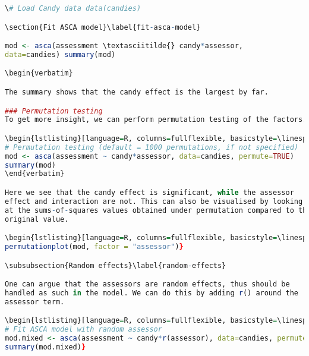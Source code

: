 \begin{lstlisting}[language=R, columns=fullflexible, basicstyle=\linespread{0.85}\small\ttfamily, stringstyle=\color{DarkGreen}, keywordstyle=\color{blue}, commentstyle=\color{DarkGreen},]\# Load Candy data data(candies)

\section{Fit ASCA model}\label{fit-asca-model}

mod <- asca(assessment \textasciitilde{} candy*assessor,
data=candies) summary(mod)

\begin{verbatim}

The summary shows that the candy effect is the largest by far.

### Permutation testing
To get more insight, we can perform permutation testing of the factors.

\begin{lstlisting}[language=R, columns=fullflexible, basicstyle=\linespread{0.85}\small\ttfamily, stringstyle=\color{DarkGreen}, keywordstyle=\color{blue}, commentstyle=\color{DarkGreen},]
# Permutation testing (default = 1000 permutations, if not specified)
mod <- asca(assessment ~ candy*assessor, data=candies, permute=TRUE)
summary(mod)
\end{verbatim}

Here we see that the candy effect is significant, while the assessor
effect and interaction are not. This can also be visualised by looking
at the sums-of-squares values obtained under permutation compared to the
original value.

\begin{lstlisting}[language=R, columns=fullflexible, basicstyle=\linespread{0.85}\small\ttfamily, stringstyle=\color{DarkGreen}, keywordstyle=\color{blue}, commentstyle=\color{DarkGreen},]
permutationplot(mod, factor = "assessor")}

\subsubsection{Random effects}\label{random-effects}

One can argue that the assessors are random effects, thus should be
handled as such in the model. We can do this by adding r() around the
assessor term.

\begin{lstlisting}[language=R, columns=fullflexible, basicstyle=\linespread{0.85}\small\ttfamily, stringstyle=\color{DarkGreen}, keywordstyle=\color{blue}, commentstyle=\color{DarkGreen},]
# Fit ASCA model with random assessor
mod.mixed <- asca(assessment ~ candy*r(assessor), data=candies, permute=TRUE)
summary(mod.mixed)}


\end{lstlisting}

